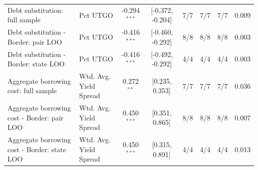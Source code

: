 {\begin{tabular}{llcccccc}
Debt substitution: full sample & Pct UTGO & -0.294$^{***}$ & [-0.372, -0.204] & 7/7 & 7/7 & 7/7 & 0.009\\
Debt substitution - Border: pair LOO & Pct UTGO & -0.416$^{***}$ & [-0.460, -0.292] & 8/8 & 8/8 & 8/8 & 0.003\\
Debt substitution - Border: state LOO & Pct UTGO & -0.416$^{***}$ & [-0.492, -0.292] & 4/4 & 4/4 & 4/4 & 0.003\\
Aggregate borrowing cost: full sample & Wtd. Avg. Yield Spread & 0.272$^{**}$ & [0.235, 0.353] & 7/7 & 7/7 & 7/7 & 0.036\\
Aggregate borrowing cost - Border: pair LOO & Wtd. Avg. Yield Spread & 0.450$^{***}$ & [0.351, 0.865] & 8/8 & 8/8 & 8/8 & 0.007\\
Aggregate borrowing cost - Border: state LOO & Wtd. Avg. Yield Spread & 0.450$^{***}$ & [0.315, 0.891] & 4/4 & 4/4 & 4/4 & 0.013\\
\bottomrule
\end{tabular}%
}
\par\endgroup
